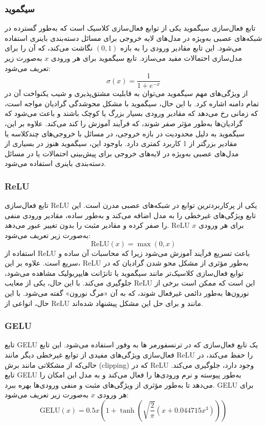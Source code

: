 \subsubsection{سیگموید}
تابع فعال‌سازی سیگموید%
یکی از توابع فعال‌سازی کلاسیک است که به‌طور گسترده در شبکه‌های عصبی به‌ویژه در مدل‌های لایه خروجی برای مسائل دسته‌بندی باینری استفاده می‌شود. این تابع مقادیر ورودی را به بازه $(0, 1)$ نگاشت می‌کند، که آن را برای مدل‌سازی احتمالات مفید می‌سازد. تابع سیگموید برای هر ورودی $x$ به‌صورت زیر تعریف می‌شود:
$$
\sigma(x) = \frac{1}{1 + e^{-x}}
$$
از ویژگی‌های مهم سیگموید می‌توان به قابلیت مشتق‌پذیری و شیب یکنواخت آن در تمام دامنه اشاره کرد. با این حال، سیگموید با مشکل محوشدگی گرادیان مواجه است، که زمانی رخ می‌دهد که مقادیر ورودی بسیار بزرگ یا کوچک باشند و باعث می‌شود که گرادیان‌ها به‌طور مؤثر صفر شوند، که فرآیند آموزش را کند می‌کند. علاوه بر این، سیگموید به دلیل محدودیت در بازه خروجی، در مسائل با خروجی‌های چندکلاسه یا مقادیر بزرگتر از 1 کاربرد کمتری دارد. باوجود این، سیگموید هنوز در بسیاری از مدل‌های عصبی به‌ویژه در لایه‌های خروجی برای پیش‌بینی احتمالات یا در مسائل دسته‌بندی باینری استفاده می‌شود.

\subsubsection{ReLU}
تابع فعال‌سازی ReLU%
یکی از پرکاربردترین توابع در شبکه‌های عصبی مدرن است. این تابع ویژگی‌های غیرخطی را به مدل اضافه می‌کند و به‌طور ساده، مقادیر ورودی منفی را صفر کرده و مقادیر مثبت را بدون تغییر عبور می‌دهد. ReLU برای هر ورودی $x$ به‌صورت زیر تعریف می‌شود:
$$
\text{ReLU}(x) = \max(0, x)
$$
استفاده از ReLU باعث تسریع فرآیند آموزش می‌شود زیرا که محاسبات آن ساده و سریع است. علاوه بر این، ReLU به‌طور مؤثری از مشکل محو شدن گرادیان که در توابع فعال‌سازی کلاسیک‌تر مانند سیگموید یا تانژانت هایپربولیک مشاهده می‌شود، جلوگیری می‌کند. با این حال، یکی از معایب ReLU این است که ممکن است برخی از نورون‌ها به‌طور دائمی غیرفعال شوند، که به آن «مرگ نورون» گفته می‌شود. با این حال، انواعی از ReLU مانند  و  برای حل این مشکل پیشنهاد شده‌اند.


\subsubsection{GELU}
تابع GELU%
یک تابع فعال‌سازی که در ترنسفورمر ها به وفور استفاده می‌شود.  این تابع فعال‌سازی ویژگی‌های مفیدی از توابع غیرخطی دیگر مانند ReLU را حفظ می‌کند، در حالی‌که از مشکلاتی مانند برش (clipping) که در ReLU وجود دارد، جلوگیری می‌کند. تابع GELU به‌طور پیوسته و نرم ورودی‌ها را فعال می‌کند و به مدل این امکان را می‌دهد تا به‌طور مؤثری از ویژگی‌های مثبت و منفی ورودی‌ها بهره ببرد. GELU برای هر ورودی $x$ به‌صورت زیر تعریف می‌شود:
$$
\text{GELU}(x) = 0.5x \left( 1 + \tanh\left( \sqrt{\frac{2}{\pi}}(x + 0.044715x^3) \right) \right)
$$

